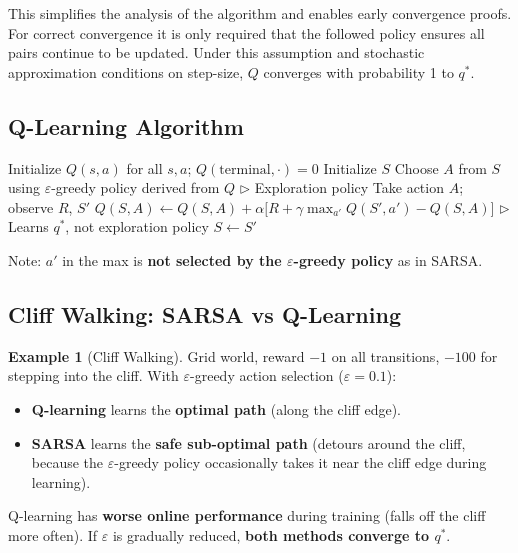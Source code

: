 \documentclass[11pt,a4paper]{article}
\theoremstyle{definition}
\newtheorem{example}{Example}[section]
\theoremstyle{plain}
\theoremstyle{remark}
\begin{document}
This simplifies the analysis of the algorithm and enables early convergence proofs. For correct convergence it is only required that the followed policy ensures all pairs continue to be updated. Under this assumption and stochastic approximation conditions on step-size, $Q$ converges with probability 1 to $q^*$.

\subsection{Q-Learning Algorithm}

\begin{algorithm}
\caption{Q-Learning (off-policy TD control), estimating $Q \approx q_*$}
\begin{algorithmic}
\STATE Initialize $Q(s, a)$ for all $s, a$; $Q(\text{terminal}, \cdot) = 0$
    \STATE Initialize $S$
    \REPEAT
        \STATE Choose $A$ from $S$ using $\varepsilon$-greedy policy derived from $Q$ \hfill $\triangleright$ Exploration policy
        \STATE Take action $A$; observe $R$, $S'$
        \STATE $Q(S, A) \leftarrow Q(S, A) + \alpha\bigl[R + \gamma \max_{a'} Q(S', a') - Q(S, A)\bigr]$ \hfill $\triangleright$ Learns $q^*$, not exploration policy
        \STATE $S \leftarrow S'$
\ENDFOR
\end{algorithmic}
\end{algorithm}

Note: $a'$ in the max is \textbf{not selected by the $\varepsilon$-greedy policy} as in SARSA.

\subsection{Cliff Walking: SARSA vs Q-Learning}

\begin{example}[Cliff Walking]
Grid world, reward $-1$ on all transitions, $-100$ for stepping into the cliff. With $\varepsilon$-greedy action selection ($\varepsilon = 0.1$):
\begin{itemize}
    \item \textbf{Q-learning} learns the \textbf{optimal path} (along the cliff edge).
    \item \textbf{SARSA} learns the \textbf{safe sub-optimal path} (detours around the cliff, because the $\varepsilon$-greedy policy occasionally takes it near the cliff edge during learning).
\end{itemize}
Q-learning has \textbf{worse online performance} during training (falls off the cliff more often). If $\varepsilon$ is gradually reduced, \textbf{both methods converge to $q^*$}.
\end{example}
\end{document}
